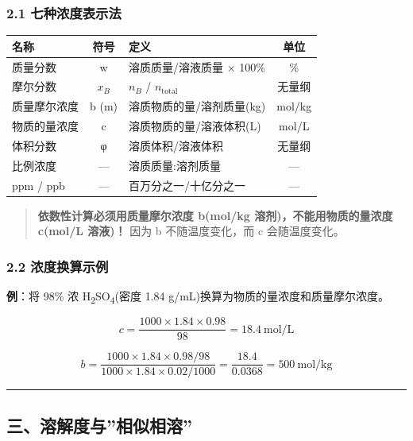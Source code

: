 \subsubsection{2.1 七种浓度表示法}\label{ux4e03ux79cdux6d53ux5ea6ux8868ux793aux6cd5}

{\def\LTcaptype{none} %
\begin{longtable}[]{@{}lclc@{}}
\toprule\noalign{}
名称 & 符号 & 定义 & 单位 \\
\midrule\noalign{}
\endhead
\bottomrule\noalign{}
\endlastfoot
质量分数 & w & 溶质质量/溶液质量 × 100\% & \% \\
摩尔分数 & \(x_B\) & \(n_B\) / \(n_{\text{total}}\) & 无量纲 \\
质量摩尔浓度 & b (m) & 溶质物质的量/溶剂质量(kg) & mol/kg \\
物质的量浓度 & c & 溶质物质的量/溶液体积(L) & mol/L \\
体积分数 & φ & 溶质体积/溶液体积 & 无量纲 \\
比例浓度 & --- & 溶质质量:溶剂质量 & --- \\
ppm / ppb & --- & 百万分之一/十亿分之一 & --- \\
\end{longtable}
}

\begin{quote}
\textbf{依数性计算必须用质量摩尔浓度 b(mol/kg 溶剂)，不能用物质的量浓度 c(mol/L 溶液)！} 因为 b 不随温度变化，而 c 会随温度变化。
\end{quote}

\subsubsection{2.2 浓度换算示例}\label{ux6d53ux5ea6ux6362ux7b97ux793aux4f8b}

\textbf{例}：将 98\% 浓 H\textsubscript{2}SO\textsubscript{4}(密度 1.84 g/mL)换算为物质的量浓度和质量摩尔浓度。

\[
c = \frac{1000 \times 1.84 \times 0.98}{98} = 18.4\ \mathrm{mol/L}
\]

\[
b = \frac{1000 \times 1.84 \times 0.98 / 98}{1000 \times 1.84 \times 0.02 / 1000} = \frac{18.4}{0.0368} = 500\ \mathrm{mol/kg}
\]

\begin{center}\rule{0.5\linewidth}{0.5pt}\end{center}

\subsection{三、溶解度与''相似相溶''}\label{ux4e09ux6eb6ux89e3ux5ea6ux4e0eux76f8ux4f3cux76f8ux6eb6}

